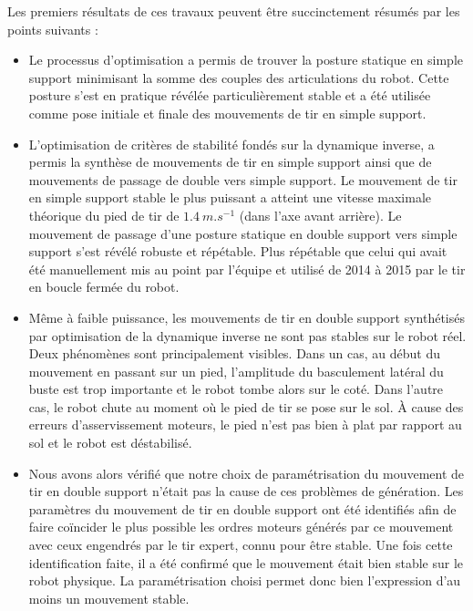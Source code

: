 Les premiers résultats de ces travaux 
peuvent être succinctement résumés par les points suivants :
\begin{itemize}
    \item Le processus d'optimisation a permis de trouver la posture statique
        en simple support minimisant la somme des couples des articulations du robot.
        Cette posture s'est en pratique révélée particulièrement stable 
        et a été utilisée comme pose initiale et finale des mouvements 
        de tir en simple support.
    \item L'optimisation de critères de stabilité fondés sur la dynamique inverse, 
        a permis la synthèse de mouvements de tir en simple support ainsi 
        que de mouvements de passage de double vers simple support.
        Le mouvement de tir en simple support stable le plus puissant
        a atteint une vitesse maximale théorique du pied de tir de $1.4~m.s^{-1}$
        (dans l'axe avant arrière).
        Le mouvement de passage d'une posture statique en double support 
        vers simple support s'est révélé robuste et répétable.
        Plus répétable que celui qui avait été manuellement mis au point 
        par l'équipe et utilisé de 2014 à 2015 par le tir en boucle fermée du robot.
    \item Même à faible puissance, les mouvements de tir 
        en double support synthétisés par optimisation de la 
        dynamique inverse ne sont pas stables sur le robot réel.
        Deux phénomènes sont principalement visibles.
        Dans un cas, au début du mouvement en passant sur un pied, 
        l'amplitude du basculement latéral du buste est trop importante 
        et le robot tombe alors sur le coté.
        Dans l'autre cas, le robot chute au moment où le pied
        de tir se pose sur le sol. 
        À cause des erreurs d'asservissement moteurs, 
        le pied n'est pas bien à plat par rapport au sol 
        et le robot est déstabilisé.
    \item Nous avons alors vérifié que notre choix de paramétrisation du mouvement 
        de tir en double support n'était pas la cause de ces problèmes de génération.
        Les paramètres du mouvement de tir en double support ont été identifiés afin
        de faire coïncider le plus possible les ordres moteurs générés par ce mouvement
        avec ceux engendrés par le tir expert, connu pour être stable.
        Une fois cette identification faite, il a été confirmé que le mouvement 
        était bien stable sur le robot physique.
        La paramétrisation choisi permet donc bien l'expression d'au moins un mouvement stable.

\end{itemize}

